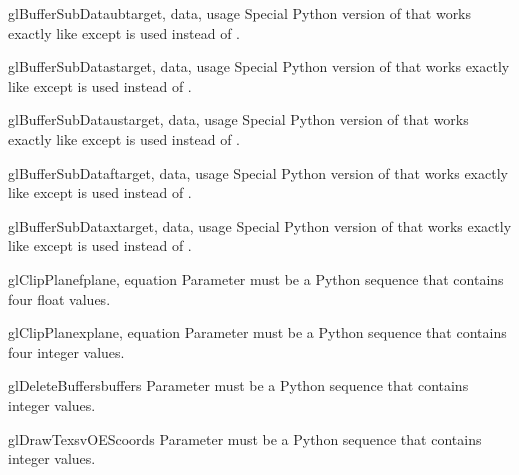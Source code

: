 \begin{funcdesc}{glBufferSubDataub}{target, data, usage}
Special Python version of  that works exactly like
 except  is used instead of
.
\end{funcdesc}

\begin{funcdesc}{glBufferSubDatas}{target, data, usage}
Special Python version of  that works exactly like
 except  is used instead of .
\end{funcdesc}

\begin{funcdesc}{glBufferSubDataus}{target, data, usage}
Special Python version of  that works exactly like
 except  is used instead of
.
\end{funcdesc}

\begin{funcdesc}{glBufferSubDataf}{target, data, usage}
Special Python version of  that works exactly like
 except  is used instead of .
\end{funcdesc}

\begin{funcdesc}{glBufferSubDatax}{target, data, usage}
Special Python version of  that works exactly like
 except  is used instead of
.
\end{funcdesc}

\begin{funcdesc}{glClipPlanef}{plane, equation}
Parameter  must be a Python sequence that contains four float
values.
\end{funcdesc}

\begin{funcdesc}{glClipPlanex}{plane, equation}
Parameter  must be a Python sequence that contains four integer
values.
\end{funcdesc}

\begin{funcdesc}{glDeleteBuffers}{buffers}
Parameter  must be a Python sequence that contains integer values.
\end{funcdesc}

\begin{funcdesc}{glDrawTexsvOES}{coords}
Parameter  must be a Python sequence that contains integer
values. 
\end{funcdesc}

